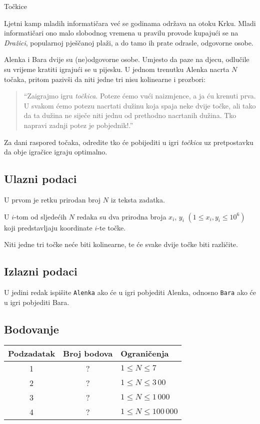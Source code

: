 \begin{statement}[
  problempoints=100,
  timelimit=1 second,
  memorylimit=1024 MiB,
]{Točkice}

Ljetni kamp mladih informatičara već se godinama održava na otoku Krku.  Mladi
informatičari ono malo slobodnog vremena u pravilu provode kupajući se na
\textit{Dražici}, popularnoj pješčanoj plaži, a do tamo ih prate odrasle,
odgovorne osobe.

Alenka i Bara dvije su (ne)odgovorne osobe. Umjesto da paze na djecu, odlučile
su vrijeme kratiti igrajući se u pijesku. U jednom trenutku Alenka nacrta $N$
točaka, pritom pazivši da niti jedne tri nisu kolinearne i prozbori:
\begin{quote}
``Zaigrajmo igru \textit{točkica}. Poteze ćemo vući naizmjence, a ja ću krenuti
  prva. U svakom ćemo potezu nacrtati dužinu koja spaja neke dvije točke, ali
  tako da ta dužina ne siječe niti jednu od prethodno nacrtanih dužina. Tko
  napravi zadnji potez je pobjednik!.''
\end{quote}
Za dani raspored točaka, odredite tko će pobijediti u igri \textit{točkica} uz
pretpostavku da obje igračice igraju optimalno.

\subsection*{Ulazni podaci}
U prvom je retku prirodan broj $N$ iz teksta zadatka.

U $i$-tom od sljedećih $N$ redaka su dva prirodna broja $x_i$, $y_i$ $(1 \leq
x_i, y_i \leq 10^6)$ koji predstavljaju koordinate $i$-te točke.

Niti jedne tri točke neće biti kolinearne, te će svake dvije točke biti različite.
\subsection*{Izlazni podaci}
U jedini redak ispišite \texttt{Alenka} ako će u igri pobjediti Alenka,
odnosno \texttt{Bara} ako će u igri pobjediti Bara.

\subsection*{Bodovanje}
{\renewcommand{\arraystretch}{1.4}
  \setlength{\tabcolsep}{6pt}
  \begin{tabular}{ccl}
 Podzadatak & Broj bodova & Ograničenja \\ \midrule
  1 & ? & $1 \le N \le 7$\\
  2 & ? & $1 \le N \le 3\,00$\\
  3 & ? & $1 \le N \le 1\,000$\\
  4 & ? & $1 \le N \le 100\,000$\\
\end{tabular}}


\end{statement}
